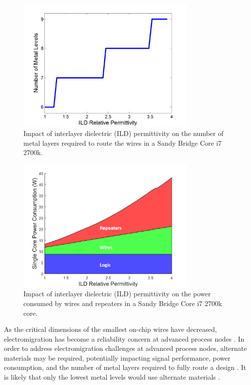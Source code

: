 \documentclass[journal,twoside]{IEEEtran}
\begin{document}
\begin{figure}[tb]
	\centering
	\includegraphics[width=3.5in]{Figures/sb_metal_layers_ild_eps_sweep_2.png}
	\caption{
		Impact of interlayer dielectric (ILD) permittivity on the number of metal layers required to route the wires in a Sandy Bridge Core i7 2700k.
	}
	\label{f-2d-materials-num-levels-ild}
\end{figure}

\begin{figure}[tb]
	\centering
	\includegraphics[width=3.5in]{Figures/total_power_sb2d_ild_permittivity_sweep_3.png}
	\caption{
		Impact of interlayer dielectric (ILD) permittivity on the power consumed by wires and repeaters in a Sandy Bridge Core i7 2700k core.
	}
	\label{f-2d-materials-power-consumption}
\end{figure}

As the critical dimensions of the smallest on-chip wires have decreased,
electromigration has become a reliability concern at advanced process nodes 
\cite{michael_electromigration_2003,tokei_reliability_2010}.
In order to address electromigration challenges at advanced process nodes, alternate materials may be required, 
potentially impacting signal performance, power consumption,
and the number of metal layers required to fully route a design \cite{adelmann_alternative_2014}. %
It is likely that only the lowest metal levels would use alternate materials \cite{oates-electromigration-2015}. 
\end{document}
